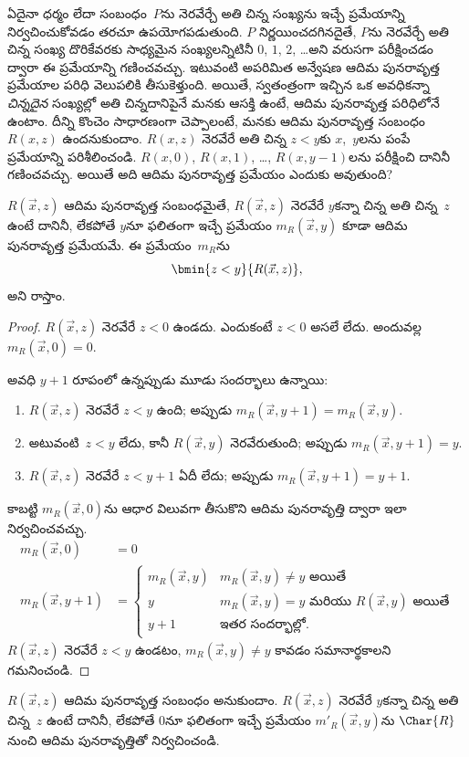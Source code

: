 \documentclass[../../../include/open-logic-section]{subfiles}
\begin{document}

\begin{explain}
ఏదైనా ధర్మం లేదా సంబంధం~$P$ను నెరవేర్చే అతి చిన్న సంఖ్యను
ఇచ్చే ప్రమేయాన్ని నిర్వచించుకోవడం తరచూ ఉపయోగపడుతుంది. $P$ నిర్ణయించదగినదైతే,
$P$ను నెరవేర్చే అతి చిన్న సంఖ్య దొరికేవరకు సాధ్యమైన సంఖ్యలన్నిటినీ
$0$, $1$, $2$, \dots అని వరుసగా పరీక్షించడం ద్వారా ఈ ప్రమేయాన్ని
గణించవచ్చు. ఇటువంటి అపరిమిత అన్వేషణ ఆదిమ పునరావృత్త ప్రమేయాల
పరిధి వెలుపలికి తీసుకెళ్తుంది. అయితే, స్వతంత్రంగా ఇచ్చిన ఒక అవధికన్నా
\emph{చిన్నదైన} సంఖ్యల్లో అతి చిన్నదానిపైనే మనకు ఆసక్తి ఉంటే, ఆదిమ పునరావృత్త
పరిధిలోనే ఉంటాం. దీన్ని కొంచెం సాధారణంగా చెప్పాలంటే, మనకు ఆదిమ పునరావృత్త
సంబంధం~$R(x,z)$ ఉందనుకుందాం. $R(x,z)$ నెరవేరే అతి చిన్న $z<y$కు
$x$,~$y$లను పంపే ప్రమేయాన్ని పరిశీలించండి. $R(x,0)$, $R(x,1)$,
\dots, $R(x,y-1)$లను పరీక్షించి దానినీ గణించవచ్చు. అయితే అది ఆదిమ
పునరావృత్త ప్రమేయం ఎందుకు అవుతుంది?
\end{explain}

\begin{prop}
$R(\vec x, z)$ ఆదిమ పునరావృత్త సంబంధమైతే, $R(\vec x, z)$ నెరవేరే
$y$కన్నా చిన్న అతి చిన్న~$z$ ఉంటే దానినీ, లేకపోతే $y$నూ ఫలితంగా ఇచ్చే
ప్రమేయం $m_R(\vec{x}, y)$ కూడా ఆదిమ పునరావృత్త ప్రమేయమే. ఈ
ప్రమేయం~$m_R$ను
\[
\bmin{z < y}{R(\vec{x}, z)},
\]
అని రాస్తాం.
\end{prop}

\begin{proof}
$R(\vec{x}, z)$ నెరవేరే $z < 0$ ఉండదు. ఎందుకంటే $z < 0$ అసలే
లేదు. అందువల్ల $m_R(\vec x, 0) = 0$.

అవధి $y+1$ రూపంలో ఉన్నప్పుడు మూడు సందర్భాలు ఉన్నాయి:
\begin{enumerate}
\item $R(\vec{x}, z)$ నెరవేరే $z < y$ ఉంది; అప్పుడు
$m_R(\vec{x}, y+1) = m_R(\vec{x}, y)$.
\item అటువంటి~$z<y$ లేదు, కానీ $R(\vec{x}, y)$ నెరవేరుతుంది; అప్పుడు
$m_R(\vec{x}, y+1) = y$.
\item $R(\vec{x}, z)$ నెరవేరే $z < y+1$ ఏదీ లేదు; అప్పుడు
$m_R(\vec{x}, y+1) = y+1$.
\end{enumerate}
కాబట్టి $m_R(\vec x, 0)$ను ఆధార విలువగా తీసుకొని ఆదిమ పునరావృత్తి
ద్వారా ఇలా నిర్వచించవచ్చు.
\begin{align*}
m_R(\vec{x}, 0) & = 0\\
m_R(\vec{x}, y+1) & =
\begin{cases}
m_R(\vec{x}, y) & \text{$m_R(\vec x,y)\neq y$ అయితే}\\
y & \text{$m_R(\vec x,y)=y$ మరియు $R(\vec x,y)$ అయితే}\\
y+1 & \text{ఇతర సందర్భాల్లో.}
\end{cases}
\end{align*}
$R(\vec x, z)$ నెరవేరే $z<y$ ఉండటం, $m_R(\vec x, y) \neq y$ కావడం
సమానార్థకాలని గమనించండి.
\end{proof}

\begin{prob}
$R(\vec x, z)$ ఆదిమ పునరావృత్త సంబంధం అనుకుందాం. $R(\vec{x}, z)$
నెరవేరే $y$కన్నా చిన్న అతి చిన్న~$z$ ఉంటే దానినీ, లేకపోతే $0$నూ
ఫలితంగా ఇచ్చే ప్రమేయం $m'_R(\vec{x}, y)$ను $\Char{R}$ నుంచి ఆదిమ
పునరావృత్తితో నిర్వచించండి.
\end{prob}
\end{document}

